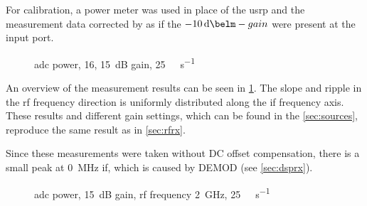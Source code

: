 \documentclass[12pt,a4paper,parskip=full,abstracton]{scrartcl}
\begin{document}
For calibration, a power meter was used in place of the \gls{usrp} and the measurement
data corrected by as if the $\SI{-10}{\deci\belm}-gain$ were present at the input port.

\begin{figure}[htb]
    \centering
{}
    \caption{\gls{adc} power, \SI{16}{\bit}, \SI{15}{\deci\bel} gain, \SI{25}{\mega\samples\per\second}}
    \label{fig:rfifrx16}
\end{figure}

An overview of the measurement results can be seen in \cref{fig:rfifrx16}. The slope and ripple
in the \gls{rf} frequency direction is uniformly distributed along the \gls{if} frequency axis.
These results and different gain settings, which can be found in the \cref{sec:sources},
reproduce the same result as in \cref{sec:rfrx}.

Since these measurements were taken without DC offset compensation, there is a small peak at 
\SI{0}{\mega\hertz} \gls{if}, which is caused by DEMOD (see \cref{sec:dsprx}).

\begin{figure}[htb]
    \centering
{}
    \caption{\gls{adc} power, \SI{15}{\deci\bel} gain, \gls{rf} frequency \SI{2}{\giga\hertz}, \SI{25}{\mega\samples\per\second}}
    \label{fig:ifrx25}
\end{figure}
\end{document}
